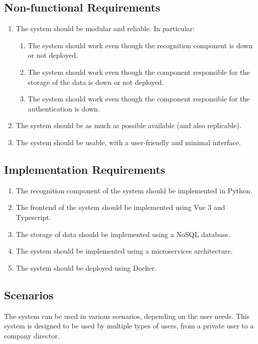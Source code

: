 \documentclass{scrartcl}
\begin{document}
    \subsection{Non-functional Requirements}\label{subsec:non-functional-requirements}
    \begin{enumerate}
        \item \label{itm:non-func-1} The system should be modular and reliable.
        In particular:
        \begin{enumerate}
            \item The system should work even though the recognition component is down or not deployed.
            \item The system should work even though the component responsible for the storage of the data is down or not deployed.
            \item The system should work even though the component responsible for the authentication is down.
        \end{enumerate}
        \item \label{itm:non-func-2} The system should be as much as possible available (and also replicable).
        \item \label{itm:non-func-3} The system should be usable, with a user-friendly and minimal interface.
    \end{enumerate}

    \subsection{Implementation Requirements}\label{subsec:implementation-requirements}
    \begin{enumerate}
        \item \label{itm:impl-1} The recognition component of the system should be implemented in Python.
        \item \label{itm:impl-2} The frontend of the system should be implemented using Vue 3 and Typescript.
        \item \label{itm:impl-3} The storage of data should be implemented using a NoSQL database.
        \item \label{itm:impl-4} The system should be implemented using a microservices architecture.
        \item \label{itm:impl-5} The system should be deployed using Docker.
    \end{enumerate}

    \subsection{Scenarios}
    The system can be used in various scenarios, depending on the user needs.
    This system is designed to be used by multiple types of users, from a private user to a company director.
\end{document}
